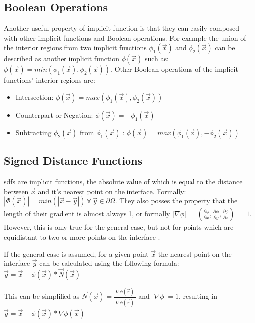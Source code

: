 \subsection{Boolean Operations}
\label{section:boolean}
Another useful property of implicit function is that they can easily composed with other implicit functions and Boolean operations. For example the union of the interior regions from two implicit functions $\phi_1(\vec{x})$ and $\phi_2(\vec{x})$ can be described as another implicit function $\phi(\vec{x})$ such as: $\phi(\vec{x}) = min(\phi_1(\vec{x}), \phi_2(\vec{x}))$. Other Boolean operations of the implicit functions' interior regions are:
 
\begin{itemize}
	\item Intersection:  $\phi(\vec{x}) = max(\phi_1(\vec{x}), \phi_2(\vec{x}))$
	\item Counterpart or Negation: $\phi(\vec{x}) = -\phi_1(\vec{x})$ 
	\item Subtracting $\phi_2(\vec{x})$ from $\phi_1(\vec{x})$ :  $\phi(\vec{x}) = max(\phi_1(\vec{x}), -\phi_2(\vec{x}))$
\end{itemize}

\subsection{Signed Distance Functions}
\Glspl{sdf} are implicit functions, the absolute value of which is equal to the distance between $\vec{x}$ and it's nearest point on the interface. Formally:  $|\Phi(\vec{x})| = min(|\vec{x} - \vec{y}|) \, \forall \, \vec{y} \in \partial\Omega$. They also posses the property that the length of their gradient is almost always 1, or formally  $|\nabla\phi| = |(\frac{\partial\phi}{\partial x},\frac{\partial\phi}{\partial y},\frac{\partial\phi}{\partial z})| = 1$. However, this is only true for the general case, but not for points which are equidistant to two or more points on the interface \cite{osher:2006:level}.

If the general case is assumed, for a given point $\vec{x}$ the nearest point on the interface $\vec{y}$ can be calculated using the following formula: $\vec{y} = \vec{x} - \phi(\vec{x}) * \vec{N}(\vec{x}) $

This can be simplified as  $\vec{N}(\vec{x}) = \frac{\nabla\phi(\vec{x})}{|\nabla\phi(\vec{x})|}$ and $|\nabla\phi| = 1$, resulting in 
$\vec{y} = \vec{x} - \phi(\vec{x}) * \nabla\phi(\vec{x}) $ \cite{osher:2006:level}

